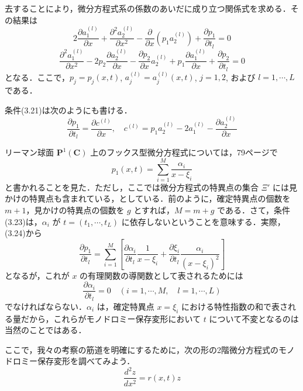 \begin{story}
去することにより，微分方程式系の係数のあいだに成り立つ関係式を求める．その結果は
\begin{equation}
    2\frac{\partial a_1^{(l)}}{\partial x} + \frac{\partial^2 a_2^{(l)}}{\partial x^2} - \frac{\partial}{\partial x}(p_1 a_2^{(l)}) + \frac{\partial p_1}{\partial t_l} = 0 \label{eq:3.21}
\end{equation}
\begin{equation}
    \frac{\partial^2 a_1^{(l)}}{\partial x^2} - 2p_2\frac{\partial a_2^{(l)}}{\partial x} - \frac{\partial p_2}{\partial x}a_2^{(l)} + p_1\frac{\partial a_1^{(l)}}{\partial x} + \frac{\partial p_2}{\partial t_l} = 0 \label{eq:3.22}
\end{equation}
となる．ここで，$p_j = p_j(x,t)$, $a_j^{(l)} = a_j^{(l)}(x,t)$, $j=1,2$, および $l=1,\cdots,L$ である．

条件(3.21)は次のようにも書ける．
\begin{equation}
    \frac{\partial p_1}{\partial t_l} = \frac{\partial c^{(l)}}{\partial x}, \quad c^{(l)} = p_1 a_2^{(l)} - 2a_1^{(l)} - \frac{\partial a_2^{(l)}}{\partial x} \label{eq:3.23}
\end{equation}

リーマン球面 $\mathbf{P}^1(\mathbf{C})$ 上のフックス型微分方程式については，79ページで
\begin{equation}
    p_1(x,t) = \sum_{i=1}^M \frac{\alpha_i}{x-\xi_i} \label{eq:3.24}
\end{equation}
と書かれることを見た．ただし，ここでは微分方程式の特異点の集合 $\Xi'$ には見かけの特異点も含まれている，としている．前のように，確定特異点の個数を $m+1$，見かけの特異点の個数を $g$ とすれば，$M=m+g$ である．さて，条件(3.23)は，$\alpha_i$ が $t=(t_1,\cdots,t_L)$ に依存しないということを意味する．実際，(3.24)から
\begin{equation*}
    \frac{\partial p_1}{\partial t_l} = \sum_{i=1}^M \left[ \frac{\partial \alpha_i}{\partial t_l} \frac{1}{x-\xi_i} + \frac{\partial \xi_i}{\partial t_l} \frac{\alpha_i}{(x-\xi_i)^2} \right]
\end{equation*}
となるが，これが $x$ の有理関数の導関数として表されるためには
\begin{equation*}
    \frac{\partial \alpha_i}{\partial t_l} = 0 \quad (i=1,\cdots,M, \quad l=1,\cdots,L)
\end{equation*}
でなければならない．$\alpha_i$ は，確定特異点 $x=\xi_i$ における特性指数の和で表される量だから，これらがモノドロミー保存変形において $t$ について不変となるのは当然のことではある．

ここで，我々の考察の筋道を明確にするために，次の形の2階微分方程式のモノドロミー保存変形を調べてみよう．
\begin{equation}
    \frac{d^2 z}{dx^2} = r(x,t)z \label{eq:3.25}
\end{equation}
\end{story}

